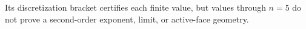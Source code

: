 Its discretization bracket certifies each finite value, but values through \(n=5\) do not prove a second-order exponent, limit, or active-face geometry.